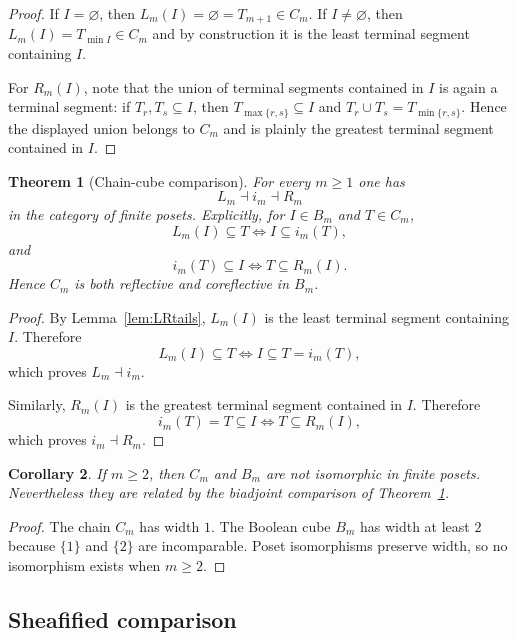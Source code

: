 \documentclass[11pt,a4paper]{article}
\numberwithin{equation}{section}
\newtheorem{theorem}{Theorem}[section]
\newtheorem{corollary}[theorem]{Corollary}
\theoremstyle{definition}
\theoremstyle{remark}
\begin{document}
\begin{proof}
If $I=\varnothing$, then $L_m(I)=\varnothing=T_{m+1}\in C_m$.  If $I\neq\varnothing$, then $L_m(I)=T_{\min I}\in C_m$ and by construction it is the least terminal segment containing $I$.

For $R_m(I)$, note that the union of terminal segments contained in $I$ is again a terminal segment: if $T_r,T_s\subseteq I$, then $T_{\max\{r,s\}}\subseteq I$ and $T_r\cup T_s=T_{\min\{r,s\}}$.  Hence the displayed union belongs to $C_m$ and is plainly the greatest terminal segment contained in $I$.
\end{proof}

\begin{theorem}[Chain-cube comparison]\label{thm:chain-cube}
For every $m\ge1$ one has
\[
L_m\dashv i_m\dashv R_m
\]
in the category of finite posets.  Explicitly, for $I\in B_m$ and $T\in C_m$,
\[
L_m(I)\subseteq T \iff I\subseteq i_m(T),
\]
and
\[
i_m(T)\subseteq I \iff T\subseteq R_m(I).
\]
Hence $C_m$ is both reflective and coreflective in $B_m$.
\end{theorem}

\begin{proof}
By Lemma~\ref{lem:LRtails}, $L_m(I)$ is the least terminal segment containing $I$.  Therefore
\[
L_m(I)\subseteq T\iff I\subseteq T=i_m(T),
\]
which proves $L_m\dashv i_m$.

Similarly, $R_m(I)$ is the greatest terminal segment contained in $I$.  Therefore
\[
i_m(T)=T\subseteq I\iff T\subseteq R_m(I),
\]
which proves $i_m\dashv R_m$.
\end{proof}

\begin{corollary}\label{cor:not-iso-chain-cube}
If $m\ge2$, then $C_m$ and $B_m$ are not isomorphic in finite posets.  Nevertheless they are related by the biadjoint comparison of Theorem~\ref{thm:chain-cube}.
\end{corollary}

\begin{proof}
The chain $C_m$ has width $1$.  The Boolean cube $B_m$ has width at least $2$ because $\{1\}$ and $\{2\}$ are incomparable.  Poset isomorphisms preserve width, so no isomorphism exists when $m\ge2$.
\end{proof}

\subsection{Sheafified comparison}
\end{document}
